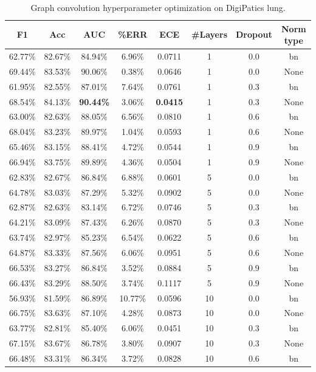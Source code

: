 \begin{table}[ht]
    \centering
    \caption{Graph convolution hyperparameter optimization on DigiPatics lung.}
\begin{tabular}{|c|c|c|c|c|c|c|c|}
\hline
F1 & Acc & AUC & \%ERR & ECE & \#Layers & Dropout & Norm type\\ \hline
62.77\% & 82.67\% & 84.94\% & 6.96\% & 0.0711 & 1 & 0.0 & bn\\ \hline
69.44\% & 83.53\% & 90.06\% & 0.38\% & 0.0646 & 1 & 0.0 & None\\ \hline
61.95\% & 82.55\% & 87.01\% & 7.64\% & 0.0761 & 1 & 0.3 & bn\\ \hline
68.54\% & 84.13\% & \textbf{90.44\%} & 3.06\% & \textbf{0.0415} & 1 & 0.3 & None\\ \hline
63.00\% & 82.63\% & 88.05\% & 6.56\% & 0.0810 & 1 & 0.6 & bn\\ \hline
68.04\% & 83.23\% & 89.97\% & 1.04\% & 0.0593 & 1 & 0.6 & None\\ \hline
65.46\% & 83.15\% & 88.41\% & 4.72\% & 0.0544 & 1 & 0.9 & bn\\ \hline
66.94\% & 83.75\% & 89.89\% & 4.36\% & 0.0504 & 1 & 0.9 & None\\ \hline
62.83\% & 82.67\% & 86.84\% & 6.88\% & 0.0601 & 5 & 0.0 & bn\\ \hline
64.78\% & 83.03\% & 87.29\% & 5.32\% & 0.0902 & 5 & 0.0 & None\\ \hline
62.87\% & 82.63\% & 83.14\% & 6.72\% & 0.0746 & 5 & 0.3 & bn\\ \hline
64.21\% & 83.09\% & 87.43\% & 6.26\% & 0.0870 & 5 & 0.3 & None\\ \hline
63.74\% & 82.97\% & 85.23\% & 6.54\% & 0.0622 & 5 & 0.6 & bn\\ \hline
64.87\% & 83.33\% & 87.56\% & 6.06\% & 0.0951 & 5 & 0.6 & None\\ \hline
66.53\% & 83.27\% & 86.84\% & 3.52\% & 0.0884 & 5 & 0.9 & bn\\ \hline
66.43\% & 83.29\% & 88.50\% & 3.74\% & 0.1117 & 5 & 0.9 & None\\ \hline
56.93\% & 81.59\% & 86.89\% & 10.77\% & 0.0596 & 10 & 0.0 & bn\\ \hline
66.75\% & 83.63\% & 87.10\% & 4.28\% & 0.0873 & 10 & 0.0 & None\\ \hline
63.77\% & 82.81\% & 85.40\% & 6.06\% & 0.0451 & 10 & 0.3 & bn\\ \hline
67.15\% & 83.67\% & 86.78\% & 3.80\% & 0.0907 & 10 & 0.3 & None\\ \hline
66.48\% & 83.31\% & 86.34\% & 3.72\% & 0.0828 & 10 & 0.6 & bn\\ \hline

\end{tabular}
\end{table}
